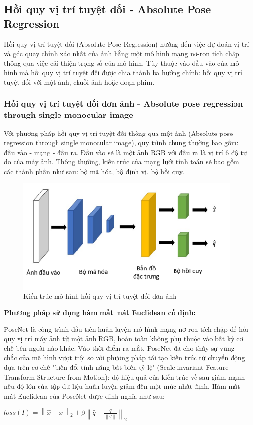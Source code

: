 \subsection{Hồi quy vị trí tuyệt đối - Absolute Pose Regression}

Hồi quy vị trí tuyệt đối (Absolute Pose Regression) hướng đến việc dự đoán vị trí và góc quay chính xác nhất của ảnh bằng một mô hình mạng nơ-ron tích chập thông qua việc cải thiện trọng số của mô hình. Tùy thuộc vào đầu vào của mô hình mà hồi quy vị trí tuyệt đối được chia thành ba hướng chính: hồi quy vị trí tuyệt đối với một ảnh, chuỗi ảnh hoặc đoạn phim.

\subsubsection*{Hồi quy vị trí tuyệt đối đơn ảnh - Absolute pose regression through single monocular image}
Với phương pháp hồi quy vị trí tuyệt đối thông qua một ảnh (Absolute pose regression through single monocular image), quy trình chung thường bao gồm: đầu vào - mạng - đầu ra. Đầu vào sẽ là một ảnh RGB với đầu ra là vị trí 6 độ tự do của máy ảnh. Thông thường, kiến trúc của mạng lưới tính toán sẽ bao gồm các thành phần như sau: bộ mã hóa, bộ định vị, bộ hồi quy.

\begin{figure}[H]
    \centering
    \includegraphics[scale=0.7]{pics/Chapter2/kientruc_APR_1.png}
    \caption{Kiến trúc mô hình hồi quy vị trí tuyệt đối đơn ảnh \cite{kendall2016posenet}}
\end{figure}

\noindent\textbf{Phương pháp sử dụng hàm mất mát Euclidean cố định:}

PoseNet \cite{kendall2016posenet} là công trình đầu tiên huấn luyện mô hình mạng nơ-ron tích chập để hồi quy vị trí máy ảnh từ một ảnh RGB, hoàn toàn không phụ thuộc vào bất kỳ cơ chế bên ngoài nào khác. Vào thời điểm ra mắt, PoseNet đã cho thấy sự vững chắc của mô hình vượt trội so với phương pháp tái tạo kiến trúc từ chuyển động dựa trên cơ chế "biến đổi tính năng bất biến tỷ lệ" (Scale-invariant Feature Transform Structure from Motion): độ hiệu quả của kiến trúc vế sau giảm mạnh nếu độ lớn của tập dữ liệu huấn luyện giảm đến một mức nhất định. Hàm mất mát Euclidean của PoseNet được định nghĩa như sau:
\begin{center}
    $loss(I) = \left \| \hat{x} - x \right \|_2 + \beta \left \| \hat{q} - \frac{q}{\left \| q \right \|} \right \|_2$
\end{center}

